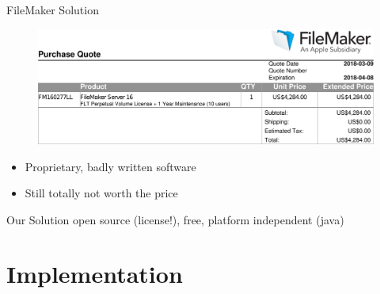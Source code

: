 \documentclass[xcolor=x11names, aspectratio=169,usenames,dvipsnames]{beamer}
\begin{document}
\begin{frame}{FileMaker Solution}
\begin{figure}
\includegraphics[width=\linewidth]{img/order.png}
\end{figure}\vspace{-2em}
\begin{itemize}
\item Proprietary, badly written software
\item Still totally not worth the price
\end{itemize}
\end{frame}

\begin{frame}{Our Solution}
open source (license!), free, platform independent (java)
\end{frame}

\section{Implementation}
\end{document}

